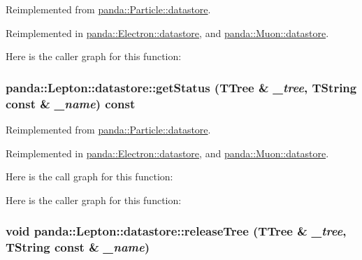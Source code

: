 Reimplemented from \hyperlink{structpanda_1_1Particle_1_1datastore_ad741e5ab6ebeb9ca897ba9472d0dea36}{panda::Particle::datastore}.

Reimplemented in \hyperlink{structpanda_1_1Electron_1_1datastore_a82e74b804ecc9c1a138d5c3fcd6ef3a3}{panda::Electron::datastore}, and \hyperlink{structpanda_1_1Muon_1_1datastore_aed9de75b6fb1e71671aa8a5b00862ace}{panda::Muon::datastore}.

Here is the caller graph for this function:\hypertarget{structpanda_1_1Lepton_1_1datastore_a44602d14a45e9a23ffdb02f9dfa7e018}{
\subsubsection[{getStatus}]{ panda::Lepton::datastore::getStatus (TTree \& {\em \_\-tree}, \/  TString const \& {\em \_\-name}) const}}
\label{structpanda_1_1Lepton_1_1datastore_a44602d14a45e9a23ffdb02f9dfa7e018}


Reimplemented from \hyperlink{structpanda_1_1Particle_1_1datastore_a09e5a80068f06d0d2118c2596258b8e3}{panda::Particle::datastore}.

Reimplemented in \hyperlink{structpanda_1_1Electron_1_1datastore_aca8cd939bbe2edf7b152348364b1ac4c}{panda::Electron::datastore}, and \hyperlink{structpanda_1_1Muon_1_1datastore_aa1c3edc46b6ca55e9b77634cdd0e6684}{panda::Muon::datastore}.

Here is the call graph for this function:

Here is the caller graph for this function:\hypertarget{structpanda_1_1Lepton_1_1datastore_a3288e551dbce7062e6f2e4e88f1a6a40}{
\subsubsection[{releaseTree}]{\setlength{\rightskip}{0pt plus 5cm}void panda::Lepton::datastore::releaseTree (TTree \& {\em \_\-tree}, \/  TString const \& {\em \_\-name})}}
\label{structpanda_1_1Lepton_1_1datastore_a3288e551dbce7062e6f2e4e88f1a6a40}


